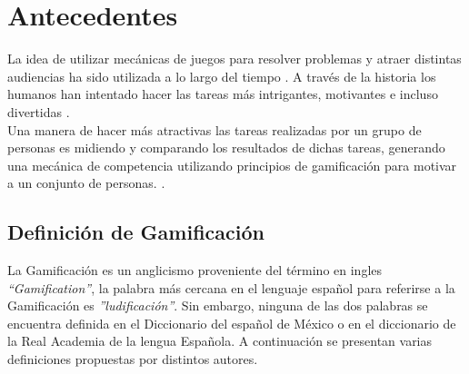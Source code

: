  \clearpage

\section{Antecedentes} \label{sec:antecedentes}

 La idea de utilizar mecánicas de juegos para resolver problemas y atraer
 distintas audiencias ha sido utilizada a lo largo del tiempo \cite{GamByDesign}.
 A través de la historia los humanos han intentado hacer las tareas más
 intrigantes, motivantes e incluso divertidas \cite{Octalysis}.\\

 \noindent Una manera de hacer más atractivas las tareas realizadas por un grupo
 de personas es midiendo y comparando los resultados de dichas tareas, generando
 una mecánica de competencia utilizando principios de gamificación para motivar
 a un conjunto de personas. \cite[p. 7]{Octalysis}.

\subsection{Definición de Gamificación}

 La Gamificación es un anglicismo proveniente del término en ingles {\it ``Gamification''},
 la palabra más cercana en el lenguaje español para referirse a la Gamificación
 es {\it ''ludificación''}. Sin embargo, ninguna de las dos palabras se encuentra
 definida en el Diccionario del español de México o en el diccionario de la Real
 Academia de la lengua Española. A continuación se presentan varias definiciones
 propuestas por distintos autores.

